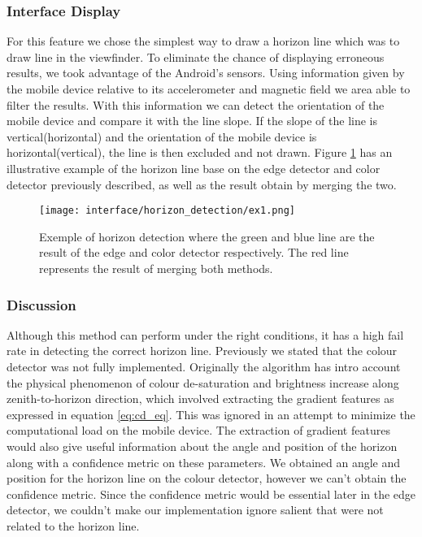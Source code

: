 \subsubsection{Interface Display}

For this feature we chose the simplest way to draw a horizon line which was to draw line in the viewfinder. To eliminate the chance of displaying erroneous results, we took advantage of the Android's sensors. Using information given by the mobile device relative to its accelerometer and magnetic field we area able to filter the results. With this information we can detect the orientation of the mobile device and compare it with the line slope. If the slope of the line is vertical(horizontal) and the orientation of the mobile device is horizontal(vertical), the line is then excluded and not drawn. Figure \ref{fig:hori_ex} has an illustrative example of the horizon line base on the edge detector and color detector previously described, as well as the result obtain by merging the two.
\begin{figure}[htbp]
	\centering
    \texttt{[image: interface/horizon\_detection/ex1.png]}
    \caption{Exemple of horizon detection where the green and blue line are the result of the edge and color detector respectively. The red line represents the result of merging both methods.}
    \label{fig:hori_ex}
\end{figure}

\subsubsection{Discussion}

Although this method can perform under the right conditions, it has a high fail rate in detecting the correct horizon line. Previously we stated that the colour detector was not fully implemented. Originally the algorithm has intro account the physical phenomenon of colour de-saturation and brightness increase along zenith-to-horizon direction, which involved extracting the gradient features as expressed in equation \ref{eq:cd_eq}. This was ignored in an attempt to minimize the computational load on the mobile device. 
The extraction of gradient features would also give useful information about the angle and position of the horizon along with a confidence metric on these parameters. We obtained an angle and position for the horizon line on the colour detector, however we can't obtain the confidence metric. Since the confidence metric would be essential later in the edge detector, we couldn't make our implementation ignore salient that were not related to the horizon line.

